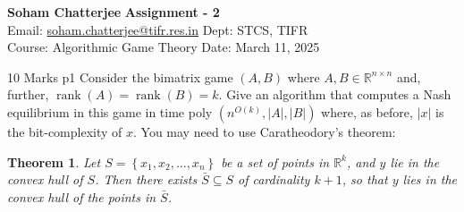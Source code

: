 \documentclass[a4paper, 11pt]{article}
\newtheorem{theorem}{Theorem}
\begin{document}
	
	
	\textsf{\noindent \large\textbf{Soham Chatterjee} \hfill \textbf{Assignment - 2}\\
		Email: \href{soham.chatterjee@tifr.res.in}{soham.chatterjee@tifr.res.in} \hfill Dept: STCS, TIFR\\
		\normalsize Course: Algorithmic Game  Theory \hfill Date: March 11, 2025}
	
\begin{problem}{%
		\hfill 10 Marks
	}{p1%
}
Consider the bimatrix game $(A, B)$ where $A, B \in \mathbb{R}^{n \times n}$ and, further, $\operatorname{rank}(A)=\operatorname{rank}(B)=k$. Give an algorithm that computes a Nash equilibrium in this game in time poly $\left(n^{O(k)},|A|,|B|\right)$ where, as before, $|x|$ is the bit-complexity of $x$. You may need to use Caratheodory's theorem:

\begin{theorem}
	 Let $S=\left\{x_1, x_2, \ldots, x_n\right\}$ be a set of points in $\mathbb{R}^k$, and $y$ lie in the convex hull of $S$. Then there exists $\bar{S} \subseteq S$ of cardinality $k+1$, so that $y$ lies in the convex hull of the points in $\bar{S}$.
\end{theorem}
\end{problem}
\end{document}
